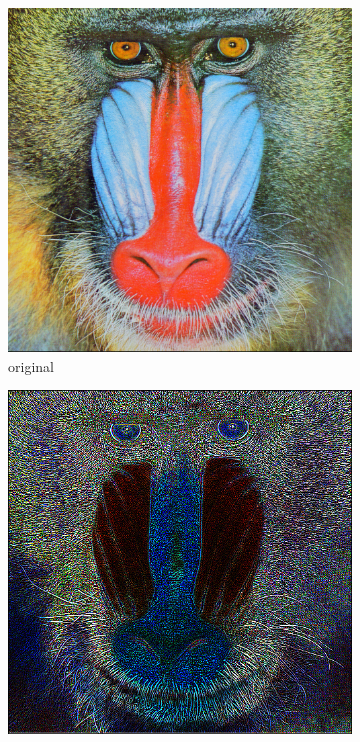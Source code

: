\documentclass[12pt]{article}
\begin{document}
\begin{figure}[H]\centering
    \begin{subfigure}[t]{\subfiguresize}
        \includegraphics[width=\textwidth]{baboon.png}
        \caption{original}
    \end{subfigure}
    \hspace{1em}
    \begin{subfigure}[t]{\subfiguresize}
        \includegraphics[width=\textwidth]{baboon_uolis.png}

\end{subfigure}
\end{figure}
\end{document}
